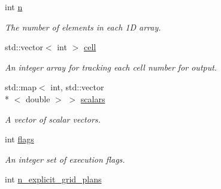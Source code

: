 \begin{DoxyCompactItemize}
\item 
\hypertarget{classone__d_1_1element_abffb6235b8bcf6e2085ad7dde0c5be3c}{int \hyperlink{classone__d_1_1element_abffb6235b8bcf6e2085ad7dde0c5be3c}{n}}\label{classone__d_1_1element_abffb6235b8bcf6e2085ad7dde0c5be3c}

\begin{DoxyCompactList}\small\item\em The number of elements in each 1\-D array. \end{DoxyCompactList}\item 
\hypertarget{classone__d_1_1element_abc6399df360c45095f825f8cc33c4016}{std\-::vector$<$ int $>$ \hyperlink{classone__d_1_1element_abc6399df360c45095f825f8cc33c4016}{cell}}\label{classone__d_1_1element_abc6399df360c45095f825f8cc33c4016}

\begin{DoxyCompactList}\small\item\em An integer array for tracking each cell number for output. \end{DoxyCompactList}\item 
\hypertarget{classone__d_1_1element_a3b4a7ca16c0882f82f9889c02ecff9e5}{std\-::map$<$ int, std\-::vector\\*
$<$ double $>$ $>$ \hyperlink{classone__d_1_1element_a3b4a7ca16c0882f82f9889c02ecff9e5}{scalars}}\label{classone__d_1_1element_a3b4a7ca16c0882f82f9889c02ecff9e5}

\begin{DoxyCompactList}\small\item\em A vector of scalar vectors. \end{DoxyCompactList}\item 
\hypertarget{classbases_1_1element_ae96e3c9a7a8c0aa53e6f98e62ecf23af}{int \hyperlink{classbases_1_1element_ae96e3c9a7a8c0aa53e6f98e62ecf23af}{flags}}\label{classbases_1_1element_ae96e3c9a7a8c0aa53e6f98e62ecf23af}

\begin{DoxyCompactList}\small\item\em An integer set of execution flags. \end{DoxyCompactList}\item 
\hypertarget{classbases_1_1element_a3fc9074c4ab78ed2a0386b1709e696bd}{int \hyperlink{classbases_1_1element_a3fc9074c4ab78ed2a0386b1709e696bd}{n\-\_\-explicit\-\_\-grid\-\_\-plans}}\label{classbases_1_1element_a3fc9074c4ab78ed2a0386b1709e696bd}


\end{DoxyCompactItemize}
